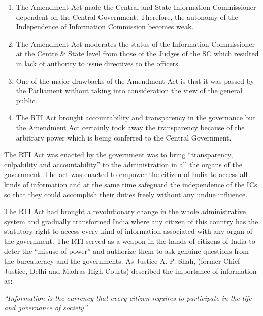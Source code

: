 \begin{multicols}{2}
\begin{enumerate}
\item The Amendment Act made the Central and State Information Commissioner
dependent on the Central Government. Therefore, the autonomy of the Independence
of Information Commission becomes weak.

\item The Amendment Act moderates the status of the Information Commissioner at the
Centre \& State level from those of the Judges of the SC which resulted in lack of
authority to issue directives to the officers.

\item One of the major drawbacks of the Amendment Act is that it was passed by the
Parliament without taking into consideration the view of the general public.

\item The RTI Act brought accountability and transparency in the governance but the
Amendment Act certainly took away the transparency because of the arbitrary power
which is being conferred to the Central Government.
\end{enumerate}

\vspace{-.3cm}


\noi
The RTI Act was enacted by the government was to bring “transparency, culpability and
accountability” to the administration in all the organs of the government. The act was enacted
to empower the citizen of India to access all kinds of information and at the same time
safeguard the independence of the ICs so that they could accomplish their duties freely
without any undue influence.

\noi
The RTI Act had brought a revolutionary change in the whole administrative system and
gradually transformed India where any citizen of this country has the statutory right to access
every kind of information associated with any organ of the government. The RTI served as a
weapon in the hands of citizens of India to deter the “misuse of power” and authorize them to
ask genuine questions from the bureaucracy and the governments. As Justice A. P. Shah,
(former Chief Justice, Delhi and Madras High Courts) described the importance of
information as:

\noi
\begin{quoting}
\textit{“Information is the currency that every citizen requires to participate in the life and
governance of society”}
\end{quoting}


\end{multicols}

